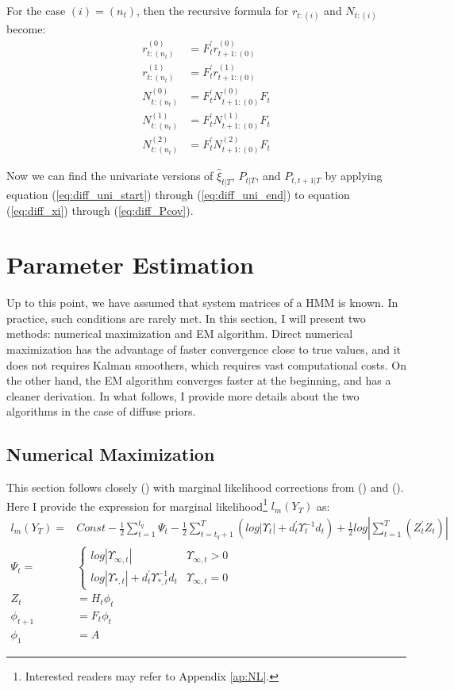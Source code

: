 \documentclass[10pt]{article}
\numberwithin{equation}{section}
\begin{document}
For the case $(i)=(n_t)$, then the recursive formula for $r_{t:(i)}$ and $N_{t:(i)}$ become:
\begin{align}
    r_{t:(n_{t})}^{(0)} &= F_{t}^{'}r_{t+1:(0)}^{(0)} \\
    r_{t:(n_t)}^{(1)} &= F_{t}^{'}r_{t+1:(0)}^{(1)} \\
    N_{t:(n_t)}^{(0)} &= F_{t}^{'}N_{t+1:(0)}^{(0)}F_{t} \\
    N_{t:(n_t)}^{(1)} &= F_{t}^{'}N_{t+1:(0)}^{(1)}F_{t} \\
    N_{t:(n_t)}^{(2)} &= F_{t}^{'}N_{t+1:(0)}^{(2)}F_{t} \label{eq:diff_uni_end}
\end{align}

Now we can find the univariate versions of $\hat{\xi}_{t|T}$, $P_{t|T}$, and $P_{t,t+1|T}$ by applying equation (\ref{eq:diff_uni_start}) through (\ref{eq:diff_uni_end}) to equation (\ref{eq:diff_xi}) through (\ref{eq:diff_Pcov}). 

\section{Parameter Estimation} \label{sec:param}
Up to this point, we have assumed that system matrices of a HMM is known. In practice, such conditions are rarely met. In this section, I will present two methods: numerical maximization and EM algorithm. Direct numerical maximization has the advantage of faster convergence close to true values, and it does not requires Kalman smoothers, which requires vast computational costs. On the other hand, the EM algorithm converges faster at the beginning, and has a cleaner derivation. In what follows, I provide more details about the two algorithms in the case of diffuse priors. 

\subsection{Numerical Maximization} \label{subsec:NM}
This section follows closely (\cite{durbin_koopman_2001}) with marginal likelihood corrections from (\cite{francke2010likelihood}) and (\cite{harville1974bayesian}). Here I provide the expression for marginal likelihood\footnote{Interested readers may refer to Appendix \ref{ap:NL}.} $l_m(Y_T)$ as:
\begin{align}
    l_m(Y_T) =& Const - \frac{1}{2}\sum_{t=1}^{t_q}\Psi_t - \frac{1}{2}\sum_{t=t_q+1}^{T}(log|\Upsilon_t| + d_t^{'}\Upsilon_t^{-1}d_t) + \frac{1}{2}log\left| \sum_{t=1}^{T}(Z_t^{'}Z_t) \right| \label{eq:NM_likelihood} \\
    \Psi_t =& \begin{cases}
        log|\Upsilon_{\infty,t}| & \Upsilon_{\infty,t} > 0 \\
        log|\Upsilon_{*,t}| + d_t^{'}\Upsilon_{*,t}^{-1}d_t & \Upsilon_{\infty,t}=0
    \end{cases} \nonumber \\
    Z_t &= H_t\phi_t \nonumber \\
    \phi_{t+1} &= F_t\phi_t \nonumber \\
    \phi_1 &= A \nonumber
\end{align}
\end{document}
